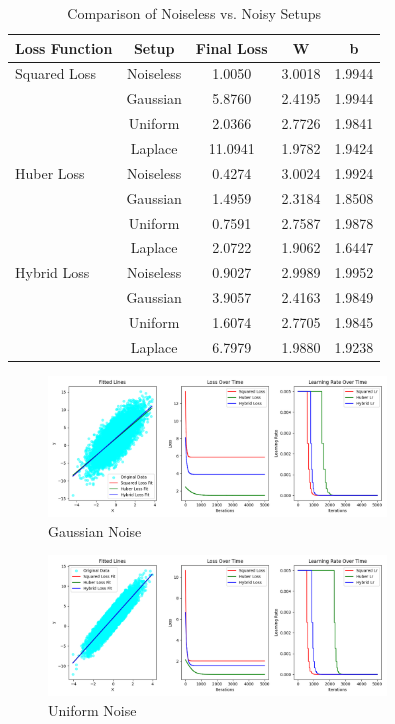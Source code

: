 \documentclass{article}
\begin{document}
\begin{table}[H]
    \centering
    \caption{Comparison of Noiseless vs. Noisy Setups}
    \label{tab:noise_comparison}
    \begin{tabular}{lcccc}
        \toprule
        \textbf{Loss Function} & \textbf{Setup} & \textbf{Final Loss} & \textbf{W} & \textbf{b} \\
        \midrule
        Squared Loss & Noiseless & 1.0050 & 3.0018 & 1.9944 \\
                     & Gaussian  & 5.8760 & 2.4195 & 1.9944 \\
                     & Uniform   & 2.0366 & 2.7726 & 1.9841 \\
                     & Laplace   & 11.0941 & 1.9782 & 1.9424 \\
        Huber Loss   & Noiseless & 0.4274 & 3.0024 & 1.9924 \\
                     & Gaussian  & 1.4959 & 2.3184 & 1.8508 \\
                     & Uniform   & 0.7591 & 2.7587 & 1.9878 \\
                     & Laplace   & 2.0722 & 1.9062 & 1.6447 \\
        Hybrid Loss  & Noiseless & 0.9027 & 2.9989 & 1.9952 \\
                     & Gaussian  & 3.9057 & 2.4163 & 1.9849 \\
                     & Uniform   & 1.6074 & 2.7705 & 1.9845 \\
                     & Laplace   & 6.7979 & 1.9880 & 1.9238 \\
        \bottomrule
    \end{tabular}
\end{table}

\begin{figure}[H]
    \centering
    \includegraphics[width=0.8\textwidth]{assets/gaussian_noise.png}
    \caption{Gaussian Noise}
    \label{fig:gaussian_noise_curve}
\end{figure}

\begin{figure}[H]
    \centering
    \includegraphics[width=0.8\textwidth]{assets/uniform_noise.png}
    \caption{Uniform Noise}
    \label{fig:uniform_noise_curve}
\end{figure}
\end{document}
